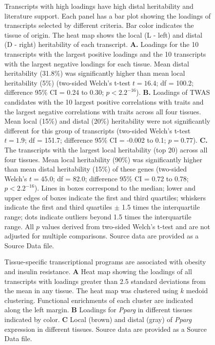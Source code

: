 \documentclass[
]{article}
\begin{document}
\begin{figure}[ht!]
\caption{Transcripts with high loadings have high distal heritability 
and literature support. Each panel has a bar plot showing 
the loadings of transcripts selected by different criteria. 
Bar color indicates the tissue of origin. The heat map 
shows the local (L - left) and distal (D - right) heritability 
of each transcript. \textbf{A.} Loadings for the 10 
transcripts with the largest positive loadings and the 10 
transcripts with the largest negative loadings for each tissue. 
Mean distal heritability (31.8\%) was significantly higher than 
mean local heritability (5\%) (two-sided Welch's 
t-test $t = 16.4$; df = 100.2; difference 95\% CI = 0.24 to 
0.30; $p < 2.2^{-16}$). \textbf{B.} Loadings of TWAS 
candidates with the 10 largest positive correlations with 
traits and the largest negative correlations with traits across 
all four tissues. Mean local (15\%) and distal (20\%) heritability
were not significantly different for this group of transcripts 
(two-sided Welch's t-test $t = 1.9$; df = 151.7; difference 95\% 
CI = -0.002 to 0.1; $p = 0.77$). \textbf{C.} The transcripts 
with the largest local heritability (top 20) across all four 
tissues. Mean local heritability (90\%) was significantly higher 
than mean distal heritability (15\%) of these genes 
(two-sided Welch's $t = 45.0$; df = 82.0; difference 95\% 
CI = 0.72 to 0.78; $p < 2.2^{-16}$). Lines in boxes correspond 
to the median; lower and upper edges of boxes indicate the 
first and third quartiles; whiskers indicate the first and 
third quartiles $\pm$ 1.5 times the interquartile range; dots 
indicate outliers beyond 1.5 times the interquartile range. All 
$p$ values derived from two-sided Welch's t-test and are 
not adjusted for multiple comparisons. Source data are 
provided as a Source Data file.
}
\label{fig:loading_heritability}
\end{figure}

\begin{figure}[ht!]
\caption{Tissue-specific transcriptional programs are 
associated with obesity and insulin resistance. \textbf{A} 
Heat map showing the loadings of all transcripts with 
loadings greater than 2.5 standard deviations from the 
mean in any tissue. The heat map was clustered using 
$k$ medoid clustering. Functional enrichments of each 
cluster are indicated along the left margin. \textbf{B} 
Loadings for \textit{Pparg} in different tissues indicated 
by color. \textbf{C} Local (brown) and distal (gray) of 
\textit{Pparg} expression in different tissues. Source data 
are provided as a Source Data file.
}
\label{fig:toa}
\end{figure}
\end{document}
